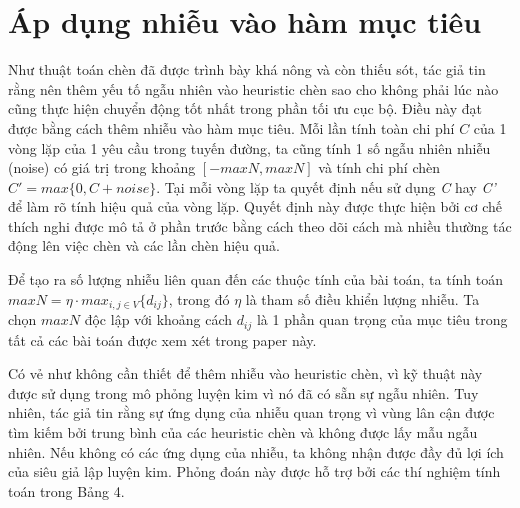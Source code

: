 \section{Áp dụng nhiễu vào hàm mục tiêu}
Như thuật toán chèn đã được trình bày khá nông và còn thiếu sót, tác giả tin rằng nên thêm yếu tố ngẫu nhiên vào heuristic chèn sao cho không phải lúc nào cũng thực hiện chuyển động tốt nhất trong phần tối ưu cục bộ. Điều này đạt được bằng cách thêm nhiễu vào hàm mục tiêu. Mỗi lần tính toàn chi phí $C$ của 1 vòng lặp của 1 yêu cầu trong tuyến đường, ta cũng tính 1 số ngẫu nhiên nhiễu (noise) có giá trị trong khoảng $\left[ -maxN, maxN \right]$ và tính chi phí chèn $C'=max\{ 0, C+noise \}$. Tại mỗi vòng lặp ta quyết định nếu sử dụng \textit{C} hay \textit{C'} để làm rõ tính hiệu quả của vòng lặp. Quyết định này được thực hiện bởi cơ chế thích nghi được mô tả ở phần trước bằng cách theo dõi cách mà nhiều thường tác động lên việc chèn và các lần chèn hiệu quả.

Để tạo ra số lượng nhiễu liên quan đến các thuộc tính của bài toán, ta tính toán $maxN = \eta\cdot max_{i,j \in V} \{d_{ij}\}$, trong đó $\eta$ là tham số điều khiển lượng nhiễu. Ta chọn $maxN$ độc lập với khoảng cách $d_{ij}$ là 1 phần quan trọng của mục tiêu trong tất cả các bài toán được xem xét trong paper này.

Có vẻ như không cần thiết để thêm nhiễu vào heuristic chèn, vì kỹ thuật này được sử dụng trong mô phỏng luyện kim vì nó đã có sẵn sự ngẫu nhiên. Tuy nhiên, tác giả tin rằng sự ứng dụng của nhiễu quan trọng vì vùng lân cận được tìm kiếm bởi trung bình của các heuristic chèn và không được lấy mẫu ngẫu nhiên. Nếu không có các ứng dụng của nhiễu, ta không nhận được đầy đủ lợi ích của siêu giả lập luyện kim. Phỏng đoán này được hỗ trợ bởi các thí nghiệm tính toán trong Bảng 4.
